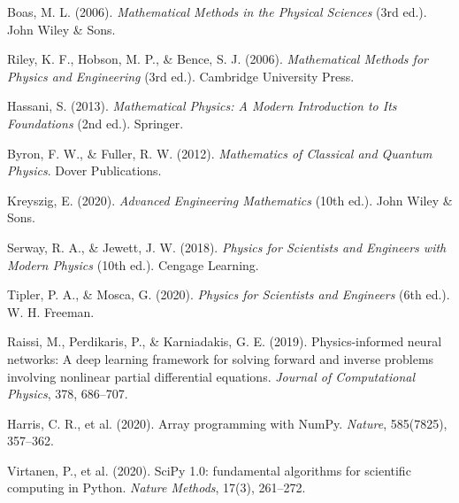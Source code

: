 \begin{enumerate}[label={[\arabic*]}, leftmargin=2.5em, itemsep=7pt]
    \item Boas, M. L. (2006). \textit{Mathematical Methods in the Physical Sciences} (3rd ed.). John Wiley \& Sons.
    \item Riley, K. F., Hobson, M. P., \& Bence, S. J. (2006). \textit{Mathematical Methods for Physics and Engineering} (3rd ed.). Cambridge University Press.
    \item Hassani, S. (2013). \textit{Mathematical Physics: A Modern Introduction to Its Foundations} (2nd ed.). Springer.
    \item Byron, F. W., \& Fuller, R. W. (2012). \textit{Mathematics of Classical and Quantum Physics}. Dover Publications.
    \item Kreyszig, E. (2020). \textit{Advanced Engineering Mathematics} (10th ed.). John Wiley \& Sons.
    \item Serway, R. A., \& Jewett, J. W. (2018). \textit{Physics for Scientists and Engineers with Modern Physics} (10th ed.). Cengage Learning.
    \item Tipler, P. A., \& Mosca, G. (2020). \textit{Physics for Scientists and Engineers} (6th ed.). W. H. Freeman.
    \item Raissi, M., Perdikaris, P., \& Karniadakis, G. E. (2019). Physics-informed neural networks: A deep learning framework for solving forward and inverse problems involving nonlinear partial differential equations. \textit{Journal of Computational Physics}, 378, 686--707.
    \item Harris, C. R., et al. (2020). Array programming with NumPy. \textit{Nature}, 585(7825), 357--362.
    \item Virtanen, P., et al. (2020). SciPy 1.0: fundamental algorithms for scientific computing in Python. \textit{Nature Methods}, 17(3), 261--272.
\end{enumerate}
